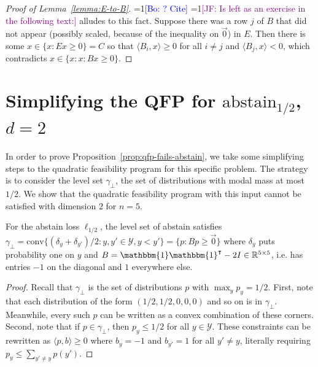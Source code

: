 \documentclass[anon]{colt2020} %
\newcommand{\Comments}{1}
\newcommand{\mynote}[2]{\ifnum\Comments=1\textcolor{#1}{#2}\fi}
\newcommand{\jessie}[1]{\mynote{purple}{[JF: #1]}}
\newcommand{\bo}[1]{\mynote{blue}{[Bo: #1]}}
\newcommand{\reals}{\mathbb{R}}
\newcommand{\abstain}[1]{\mathrm{abstain}_{#1}}
\newcommand{\Y}{\mathcal{Y}}
\newcommand{\inprod}[2]{\langle #1, #2 \rangle}%
\newcommand{\conv}{\mathrm{conv}}
\newcommand{\ones}{\mathbbm{1}}
\begin{document}
\begin{proof}[Proof of Lemma~\ref{lemma:E-to-B}]
	\bo{? Cite} \jessie{Is left as an exercise in the following text:} \cite[Exercise 2.15]{ziegler2012lectures} alludes to this fact.
	Suppose there was a row $j$ of $B$ that did not appear (possibly scaled, because of the inequality on $\vec 0$) in $E$.
	Then there is some $x \in \{x : Ex \geq 0\} = C$ so that $\inprod{B_i}{x} \geq 0$ for all $i \neq j$ and $\inprod{B_j}{x} < 0$, which contradicts $x \in \{x : x : Bx \geq 0\}$.
\end{proof}


\section{Simplifying the QFP for $\abstain{1/2}$, $d=2$}
In order to prove Proposition~\ref{prop:qfp-fails-abstain}, we take some simplifying steps to the quadratic feasibility program for this specific problem.
The strategy is to consider the level set $\gamma_{\bot}$, the set of distributions with modal mass at most $1/2$.
We show that the quadratic feasibility program with this input cannot be satisfied with dimension $2$ for $n=5$.

\begin{lemma} \label{lemma:abstain-v-h}
	For the abstain loss $\ell_{1/2}$, the level set of abstain satisfies $\gamma_{\bot} = \conv\{(\delta_y + \delta_{y'})/2 : y,y' \in \Y, y < y'\} = \{p : Bp \geq \vec{0}\}$ where $\delta_y$ puts probability one on $y$ and $B = \ones \ones^{\intercal} - 2I \in \reals^{5 \times 5}$, i.e. has entries $-1$ on the diagonal and $1$ everywhere else.
\end{lemma}
\begin{proof}
	Recall that $\gamma_{\bot}$ is the set of distributions $p$ with $\max_y p_y = 1/2$.
	First, note that each distribution of the form $(1/2, 1/2, 0, 0, 0)$ and so on is in $\gamma_{\bot}$.
	Meanwhile, every such $p$ can be written as a convex combination of these corners.
	Second, note that if $p \in \gamma_{\bot}$, then $p_y \leq 1/2$ for all $y \in \Y$.
	These constraints can be rewritten as $\inprod{p}{b} \geq 0$ where $b_y = -1$ and $b_{y'} = 1$ for all $y' \neq y$, literally requiring $p_y \leq \sum_{y' \neq y} p(y')$.
\end{proof}
\end{document}
